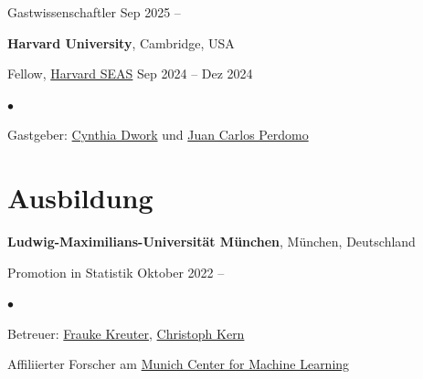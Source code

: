 \documentclass[margin,line, 10pt]{res}
\newenvironment{list2}{
	\begin{list}{$\bullet$}{%
			\setlength{\itemsep}{0in}
			\setlength{\parsep}{0in} \setlength{\parskip}{0in}
			\setlength{\topsep}{0in} \setlength{\partopsep}{0in} 
			\setlength{\leftmargin}{0.2in}}}{\end{list}}
\begin{document}
\begin{resume}
		\vspace{-0.4cm}
		Gastwissenschaftler \hfill {Sep 2025 --}
		
		\vspace{-0.25cm}
		{\bf Harvard University}, Cambridge, USA
		
		\vspace{-0.4cm}
		Fellow, \href{https://seas.harvard.edu}{Harvard SEAS} \hfill {Sep 2024 -- Dez 2024}\\
		\begin{list2}
			\vspace*{-0.3cm}
			\item Gastgeber: \href{https://dwork.seas.harvard.edu}{Cynthia Dwork} und \href{https://jcperdomo.org}{Juan Carlos Perdomo}
		\end{list2}
		
		\section{\sc Ausbildung}
		{\bf Ludwig-Maximilians-Universit\"at M\"unchen}, M\"unchen, Deutschland
		
		\vspace{-0.4cm}
		Promotion in Statistik \hfill {Oktober 2022 --} \\
		
		\begin{list2}
			\vspace*{-0.3cm}
			\item Betreuer: \href{(https://www.stat.lmu.de/soda/en/team/contact-page/frauke-kreuter-825909f7.html)}{Frauke Kreuter}, \href{https://www.stat.lmu.de/soda/en/team/contact-page/christoph-kern-11bd67d0.html}{Christoph Kern}
			\item Affiliierter Forscher am \href{https://mcml.ai}{Munich Center for Machine Learning}
		\end{list2}
		

\end{resume}
\end{document}
